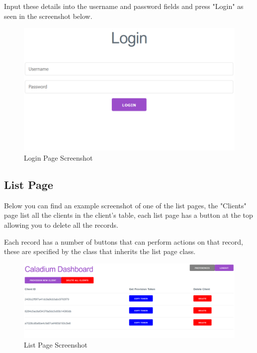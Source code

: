Input these details into the username and password fields
and press "Login" as seen in the screenshot below.

\begin{figure}[h!]
    \centering
    \includegraphics[width=1\textwidth]{images/screenshots/login_page}
    \caption{Login Page Screenshot}
    \label{image:loginPageScreenshot}
\end{figure}

\subsection{List Page}
Below you can find an example screenshot of one of the list pages,
the "Clients" page list all the clients in the client's table,
each list page has a button at the top allowing you to delete all the records.

Each record has a number of buttons that can perform actions on that record,
these are specified by the class that inherits the list page class.

\begin{figure}[h!]
    \centering
    \includegraphics[width=1\textwidth]{images/screenshots/list_page}
    \caption{List Page Screenshot}
    \label{image:listPageScreenshot}
\end{figure}

